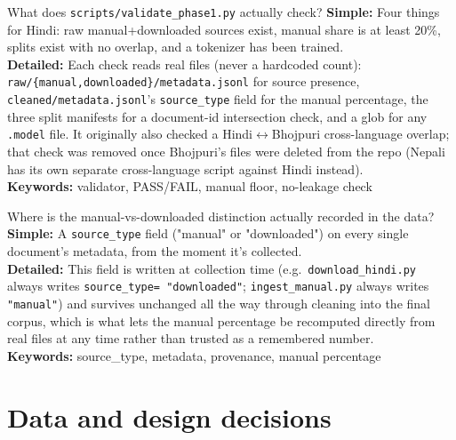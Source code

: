 \documentclass[11pt]{report}
\begin{document}
\begin{qabox}{What does \texttt{scripts/validate\_phase1.py} actually
check?}
\textbf{Simple:} Four things for Hindi: raw manual+downloaded sources
exist, manual share is at least 20\%, splits exist with no overlap, and
a tokenizer has been trained.\\
\textbf{Detailed:} Each check reads real files (never a hardcoded count):
\texttt{raw/\{manual,downloaded\}/metadata.jsonl} for source presence,
\texttt{cleaned/metadata.jsonl}'s \texttt{source\_type} field for the
manual percentage, the three split manifests for a document-id
intersection check, and a glob for any \texttt{.model} file. It
originally also checked a Hindi$\leftrightarrow$Bhojpuri cross-language
overlap; that check was removed once Bhojpuri's files were deleted from
the repo (Nepali has its own separate cross-language script against
Hindi instead).\\
\textbf{Keywords:} validator, PASS/FAIL, manual floor, no-leakage check
\end{qabox}

\begin{qabox}{Where is the manual-vs-downloaded distinction actually
recorded in the data?}
\textbf{Simple:} A \texttt{source\_type} field ("manual" or "downloaded")
on every single document's metadata, from the moment it's collected.\\
\textbf{Detailed:} This field is written at collection time (e.g.\
\texttt{download\_hindi.py} always writes \texttt{source\_type=
"downloaded"}; \texttt{ingest\_manual.py} always writes
\texttt{"manual"}) and survives unchanged all the way through cleaning
into the final corpus, which is what lets the manual percentage be
recomputed directly from real files at any time rather than trusted as a
remembered number.\\
\textbf{Keywords:} source\_type, metadata, provenance, manual percentage
\end{qabox}

\section{Data and design decisions}
\end{document}
